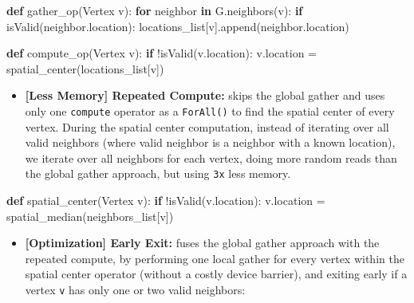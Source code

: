 \documentclass[10pt,oneside]{memoir}
\newenvironment{Shaded}{}{}
\newcommand{\ControlFlowTok}[1]{\textcolor[rgb]{0.00,0.44,0.13}{\textbf{#1}}}
\newcommand{\KeywordTok}[1]{\textcolor[rgb]{0.00,0.44,0.13}{\textbf{#1}}}
\newcommand{\NormalTok}[1]{#1}
\newcommand{\OperatorTok}[1]{\textcolor[rgb]{0.40,0.40,0.40}{#1}}
\providecommand{\tightlist}{%
  \setlength{\itemsep}{0pt}\setlength{\parskip}{0pt}}
\begin{document}
\begin{Shaded}
\begin{Highlighting}[]
\KeywordTok{def}\NormalTok{ gather_op(Vertex v):}
    \ControlFlowTok{for}\NormalTok{ neighbor }\KeywordTok{in}\NormalTok{ G.neighbors(v):}
        \ControlFlowTok{if}\NormalTok{ isValid(neighbor.location):}
\NormalTok{            locations_list[v].append(neighbor.location)}

\KeywordTok{def}\NormalTok{ compute_op(Vertex v):}
    \ControlFlowTok{if} \OperatorTok{!}\NormalTok{isValid(v.location):}
\NormalTok{        v.location }\OperatorTok{=}\NormalTok{ spatial_center(locations_list[v])}
\end{Highlighting}
\end{Shaded}

\begin{itemize}
\tightlist
\item
  \textbf{{[}Less Memory{]} Repeated Compute:} skips the global gather
  and uses only one \texttt{compute} operator as a \texttt{ForAll()} to
  find the spatial center of every vertex. During the spatial center
  computation, instead of iterating over all valid neighbors (where
  valid neighbor is a neighbor with a known location), we iterate over
  all neighbors for each vertex, doing more random reads than the global
  gather approach, but using \texttt{3x} less memory.
\end{itemize}

\begin{Shaded}
\begin{Highlighting}[]
\KeywordTok{def}\NormalTok{ spatial_center(Vertex v):}
    \ControlFlowTok{if} \OperatorTok{!}\NormalTok{isValid(v.location):}
\NormalTok{        v.location }\OperatorTok{=}\NormalTok{ spatial_median(neighbors_list[v])}
\end{Highlighting}
\end{Shaded}

\begin{itemize}
\tightlist
\item
  \textbf{{[}Optimization{]} Early Exit:} fuses the global gather
  approach with the repeated compute, by performing one local gather for
  every vertex within the spatial center operator (without a costly
  device barrier), and exiting early if a vertex \texttt{v} has only one
  or two valid neighbors:
\end{itemize}
\end{document}

